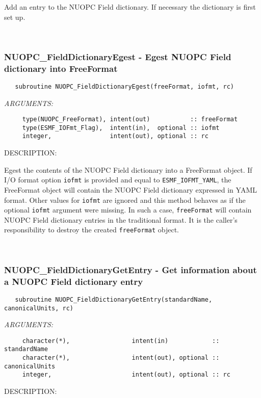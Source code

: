      Add an entry to the NUOPC Field dictionary. If necessary the dictionary is
     first set up. 
 
\mbox{}\hrulefill\ 
 
\subsubsection [NUOPC\_FieldDictionaryEgest] {NUOPC\_FieldDictionaryEgest - Egest NUOPC Field dictionary into FreeFormat}


\begin{verbatim}   subroutine NUOPC_FieldDictionaryEgest(freeFormat, iofmt, rc)\end{verbatim}{\em ARGUMENTS:}
\begin{verbatim}     type(NUOPC_FreeFormat), intent(out)           :: freeFormat
     type(ESMF_IOFmt_Flag),  intent(in),  optional :: iofmt
     integer,                intent(out), optional :: rc\end{verbatim}
{\sf DESCRIPTION:\\ }


     Egest the contents of the NUOPC Field dictionary into a FreeFormat object.
     If I/O format option {\tt iofmt} is provided and equal to {\tt ESMF\_IOFMT\_YAML},
     the FreeFormat object will contain the NUOPC Field dictionary expressed in YAML
     format. Other values for {\tt iofmt} are ignored and this method behaves as if
     the optional {\tt iofmt} argument were missing. In such a case, {\tt freeFormat}
     will contain NUOPC Field dictionary entries in the traditional format.
     It is the caller's responsibility to destroy the created {\tt freeFormat}
     object. 
 
\mbox{}\hrulefill\ 
 
\subsubsection [NUOPC\_FieldDictionaryGetEntry] {NUOPC\_FieldDictionaryGetEntry - Get information about a NUOPC Field dictionary entry}


\begin{verbatim}   subroutine NUOPC_FieldDictionaryGetEntry(standardName, canonicalUnits, rc)\end{verbatim}{\em ARGUMENTS:}
\begin{verbatim}     character(*),                 intent(in)            :: standardName
     character(*),                 intent(out), optional :: canonicalUnits
     integer,                      intent(out), optional :: rc\end{verbatim}
{\sf DESCRIPTION:\\ }


